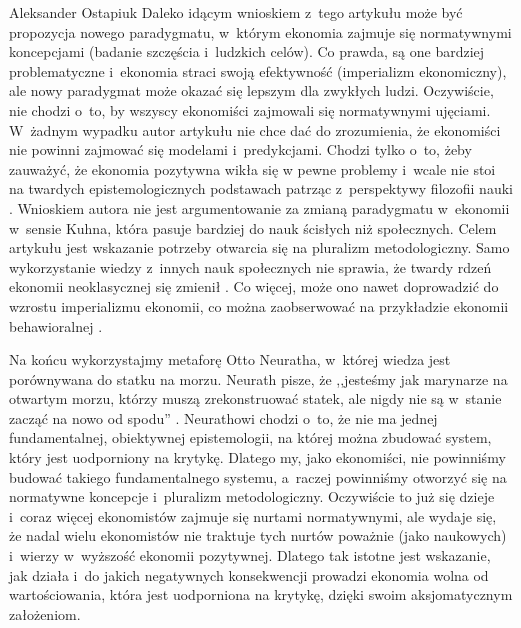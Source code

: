 \begin{artplenv}{Aleksander Ostapiuk}
Daleko idącym wnioskiem z~tego artykułu może być propozycja nowego paradygmatu, w~którym ekonomia zajmuje się
normatywnymi koncepcjami (badanie szczęścia i~ludzkich celów). Co prawda, są one bardziej
problematyczne i~ekonomia straci swoją efektywność (imperializm ekonomiczny), ale nowy paradygmat może okazać
się lepszym dla zwykłych
ludzi. Oczywiście, nie chodzi o~to, by wszyscy ekonomiści zajmowali się normatywnymi ujęciami. W~żadnym wypadku autor
artykułu nie chce dać do zrozumienia, że ekonomiści nie powinni zajmować się modelami i~predykcjami. Chodzi tylko o~to,
żeby zauważyć, że ekonomia pozytywna wikła się w pewne problemy i~wcale nie stoi na twardych epistemologicznych
podstawach patrząc z~perspektywy filozofii nauki
\parencite{kuhn_structure_1962,feyerabend_against_1975,lakatos_methodology_1980,caldwell_beyond_1982,mccloskey_rhetoric_1998,hands_reflection_2001}.
Wnioskiem autora nie jest argumentowanie za zmianą
paradygmatu w~ekonomii w~sensie Kuhna, która pasuje bardziej do nauk ścisłych niż społecznych.
Celem artykułu jest wskazanie potrzeby
otwarcia się na pluralizm metodologiczny. Samo wykorzystanie wiedzy z~innych nauk społecznych nie sprawia, że twardy
rdzeń ekonomii neoklasycznej się zmienił
\parencite[zob.][]{dow_foundations_2012}.
Co więcej, może ono nawet
doprowadzić do wzrostu imperializmu ekonomii, co można zaobserwować na przykładzie ekonomii behawioralnej
\parencite{berg_as-if_2010}.

Na końcu wykorzystajmy metaforę Otto Neuratha, w~której wiedza jest porównywana do statku na morzu. Neurath pisze, że
,,jesteśmy jak marynarze na otwartym morzu, którzy muszą zrekonstruować statek, ale nigdy nie są w~stanie zacząć na nowo
od spodu''
\parencite[s.~199]{neurath_anti-spengler_1973}.
Neurathowi chodzi o~to, że nie ma jednej fundamentalnej,
obiektywnej epistemologii, na której można zbudować system, który jest uodporniony na krytykę. Dlatego my, jako
ekonomiści, nie powinniśmy budować takiego fundamentalnego systemu, a~raczej powinniśmy otworzyć się na normatywne
koncepcje i~pluralizm metodologiczny. Oczywiście to już się dzieje i~coraz więcej ekonomistów zajmuje się nurtami
normatywnymi, ale wydaje się, że nadal wielu ekonomistów nie traktuje tych nurtów poważnie
(jako naukowych) i~wierzy w~wyższość ekonomii pozytywnej.
Dlatego tak istotne jest wskazanie, jak działa i~do jakich negatywnych konsekwencji
prowadzi ekonomia wolna od wartościowania, która jest uodporniona na krytykę, dzięki swoim aksjomatycznym założeniom. 

\end{artplenv}\label{ost-stop}